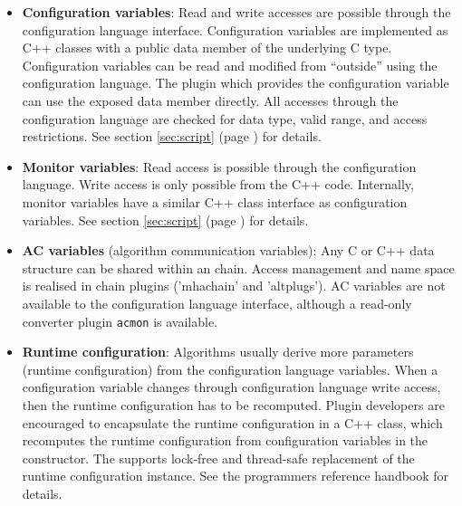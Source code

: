 \begin{itemize}
\item{\bf Configuration variables}: Read and
  write accesses are possible through the \mha{} configuration language interface.
  Configuration variables are implemented as C++ classes with a public data
  member of the underlying C type.
  Configuration variables can be read and modified from ``outside'' using the 
  configuration language.
  The plugin which provides the configuration variable can use 
  the exposed data member directly.
  All accesses through the \mha{} configuration language are checked for data
  type, valid range, and access restrictions. 
  See section \ref{sec:script} (page
  \pageref{sec:script}) for details.
  
\item{\bf Monitor variables}: Read access is possible
  through the \mha{} configuration language. 
  Write access is only possible from the C++ code. 
  Internally, monitor variables have a similar C++ class interface
  as configuration
  variables. See section \ref{sec:script} (page \pageref{sec:script}) for
  details.
  
\item{\bf AC variables} (algorithm
    communication variables): Any C or C++ data structure can be
    shared within an \mha{} chain. Access management and name space is
    realised in \mha{} chain plugins ('mhachain' and
    'altplugs'). 
    AC variables are not available to the \mha{} configuration language interface,
    although a read-only converter plugin \verb!acmon! is available.
  
\item{\bf Runtime configuration}: Algorithms
  usually derive more parameters (runtime configuration)
  from the \mha{} configuration language variables. 
  When a configuration variable changes through configuration language write 
  access, then the runtime configuration has to be recomputed.  
  Plugin developers are encouraged to encapsulate the runtime configuration in 
  a C++ class, which recomputes the runtime configuration from 
  configuration variables in the constructor.
  The \mha{} supports lock-free and thread-safe replacement of the 
  runtime configuration instance.
  See the programmers reference handbook for details.
\end{itemize}

